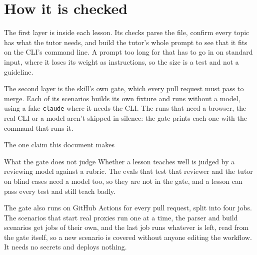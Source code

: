 \documentclass[11pt]{article}
\begin{document}
\section{How it is checked}


The first layer is inside each lesson. Its checks parse the file, confirm every topic has what
the tutor needs, and build the tutor's whole prompt to see that it fits on the CLI's command
line. A prompt too long for that has to go in on standard input, where it loses its weight as
instructions, so the size is a test and not a guideline.

The second layer is the skill's own gate, which every pull request must pass to merge. Each of
its scenarios builds its own fixture and runs without a model, using a fake \texttt{claude}
where it needs the CLI. The runs that need a browser, the real CLI or a model aren't skipped in
silence: the gate prints each one with the command that runs it.

%
{The one claim this document makes}

\begin{hscallout}{What the gate does not judge}
Whether a lesson teaches well is judged by a reviewing model against a rubric. The evals that
test that reviewer and the tutor on blind cases need a model too, so they are not in the gate,
and a lesson can pass every test and still teach badly.
\end{hscallout}

\newpage

The gate also runs on GitHub Actions for every pull request, split into four jobs. The scenarios
that start real proxies run one at a time, the parser and build scenarios get jobs of their own,
and the last job runs whatever is left, read from the gate itself, so a new scenario is covered
without anyone editing the workflow. It needs no secrets and deploys nothing.
\end{document}
